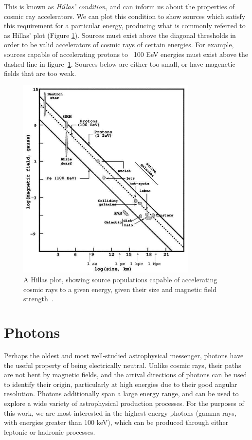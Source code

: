 This is known as \textit{Hillas' condition}, and can inform us about the properties of cosmic ray accelerators. We can plot this condition to show sources which satisfy this requirement for a particular energy, producing what is commonly referred to as Hillas' plot (Figure \ref{fig:hillasplot}). Sources must exist above the diagonal thresholds in order to be valid accelerators of cosmic rays of certain energies. For example, sources capable of accelerating protons to ~100 EeV energies must exist above the dashed line in figure~\ref{fig:hillasplot}. Sources below are either too small, or have magenetic fields that are too weak.    

\begin{figure}[h]
\centering
\includegraphics[width=0.8\textwidth]{figs/HillasPlot.jpg}
\caption{A Hillas plot, showing source populations capable of accelerating cosmic rays to a given energy, given their size and magnetic field strength~\cite{hillasplotsrc}.}
\label{fig:hillasplot}
\end{figure}


\section{Photons}
Perhaps the oldest and most well-studied astrophysical messenger, photons have the useful property of being electrically neutral. Unlike cosmic rays, their paths are not bent by magnetic fields, and the arrival directions of photons can be used to identify their origin, particularly at high energies due to their good angular resolution. Photons additionally span a large energy range, and can be used to explore a wide variety of astrophysical production processes. For the purposes of this work, we are most interested in the highest energy photons (gamma rays, with energies greater than 100 keV), which can be produced through either leptonic or hadronic processes.

